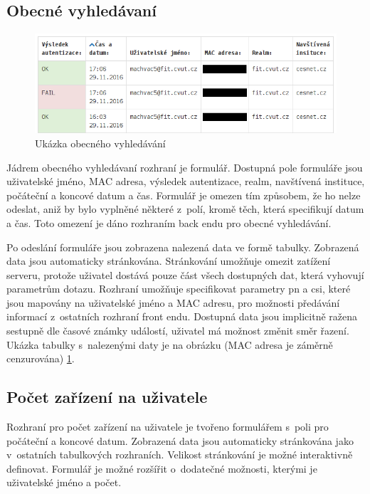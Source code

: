 \documentclass[thesis=M,czech]{FITthesis}[2012/06/26]
\begin{document}
    \subsection{Obecné vyhledávaní}

      \begin{figure}[!ht]
        \centering
          \includegraphics[scale=0.5]{search.png}
        \caption[Ukázka obecného vyhledávání]{Ukázka obecného vyhledávání}
        \label{fig:search}
      \end{figure}

      Jádrem obecného vyhledávaní rozhraní je formulář.
      Dostupná pole formuláře jsou uživatelské jméno,
      MAC adresa, výsledek autentizace, realm, navštívená instituce,
      počáteční a koncové datum a čas.
      Formulář je omezen tím způsobem, že ho nelze
      odeslat, aniž by bylo vyplněné některé z~polí,
      kromě těch, která specifikují datum a čas.
      Toto omezení je dáno rozhraním back endu pro obecné vyhledávání.

      Po odeslání formuláře jsou zobrazena nalezená data ve formě tabulky.
      Zobrazená data jsou automaticky stránkována.
      Stránkování umožňuje omezit zatížení serveru,
      protože uživatel dostává pouze část všech dostupných dat, která vyhovují parametrům dotazu.
      Rozhraní umožňuje specifikovat parametry pn a csi, 
      které jsou mapovány na uživatelské jméno a MAC adresu, pro možnosti
      předávání informací z~ostatních rozhraní front endu.
      Dostupná data jsou implicitně ražena sestupně dle časové známky událostí,
      uživatel má možnost změnit směr řazení.
      Ukázka tabulky s~nalezenými daty je na obrázku (MAC adresa je záměrně cenzurována) \ref{fig:search}.

    \subsection{Počet zařízení na uživatele}

      Rozhraní pro počet zařízení na uživatele je tvořeno
      formulářem s~poli pro počáteční a koncové datum.
      Zobrazená data jsou automaticky stránkována jako v~ostatních tabulkových rozhraních.
      Velikost stránkování je možné interaktivně definovat.
      Formulář je možné rozšířit o~dodatečné možnosti, kterými je
      uživatelské jméno a počet.
      
\end{document}
